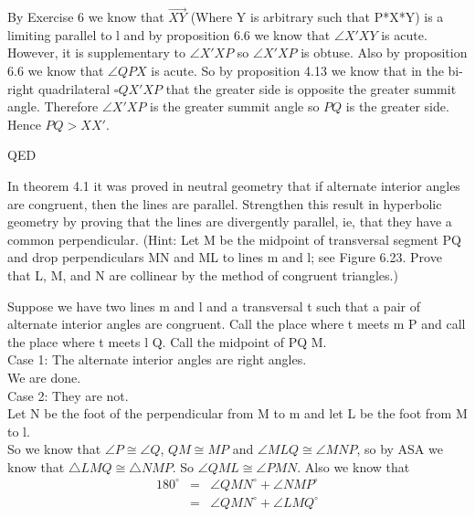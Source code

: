 \documentclass[12pt,letterpaper]{article}
\newcommand{\Proof}{\noindent {\bf Proof: }}
\newcommand{\QED}{\begin{flushright}QED\end{flushright}}
\newcommand{\prob}[1]{\newpage\noindent {\bf #1}}
\begin{document}
\Proof

By Exercise 6 we know that $\overrightarrow{XY}$ (Where Y is arbitrary such that P*X*Y) is a limiting parallel to l and by proposition 6.6 we know that $\angle X'XY$ is acute.  However, it is supplementary to $\angle X'XP$ so $\angle X'XP$ is obtuse.  Also by proposition 6.6 we know that $\angle QPX$ is acute.  So by proposition 4.13 we know that in the bi-right quadrilateral $\square QX'XP$ that the greater side is opposite the greater summit angle.  Therefore $\angle X'XP$ is the greater summit angle so $PQ$ is the greater side.  Hence $ PQ > XX'$.

\QED








\prob{12 } In theorem 4.1 it was proved in neutral geometry that if alternate interior angles are congruent, then the lines are parallel.  Strengthen this result in hyperbolic geometry by proving that the lines are divergently parallel, ie, that they have a common perpendicular.  (Hint: Let M be the midpoint of transversal segment PQ and drop perpendiculars MN and ML to lines m and l;  see Figure 6.23.  Prove that L, M, and N are collinear by the method of congruent triangles.)


\Proof

Suppose we have two lines m and l and a transversal t such that a pair of alternate interior angles are congruent.   Call the place where t meets m P and call the place where t meets l Q.  Call the midpoint of PQ M. \\

\noindent Case 1: The alternate interior angles are right angles. \\

We are done.\\

\noindent Case 2: They are not.\\

Let N be the foot of the perpendicular from M to m and let L be the foot from M to l.    \\

So we know that $\angle P \cong \angle Q$, $QM \cong MP$ and $\angle MLQ \cong \angle MNP$, so by ASA we know that $\triangle LMQ \cong \triangle NMP$. So $\angle QML \cong \angle PMN$.  Also we know that 
\begin{eqnarray*}
180^\circ &=& \angle QMN^\circ + \angle NMP^\circ\\
&=& \angle QMN^\circ + \angle LMQ^\circ
\end{eqnarray*}
\end{document}
